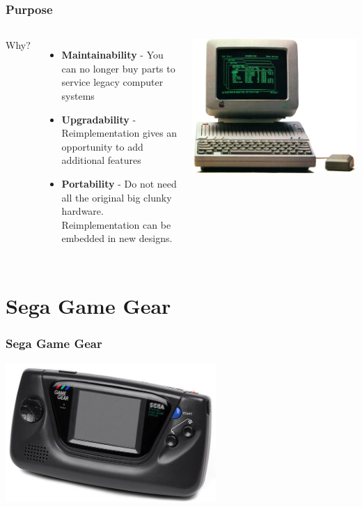 \documentclass{beamer}
\begin{document}
\begin{frame}
    \frametitle{Purpose}

    \begin{columns}[c]
            Why?
            \begin{itemize}
                \item<2-> \textbf{Maintainability} - You can no longer buy parts to service legacy computer systems
                \item<3-> \textbf{Upgradability} - Reimplementation gives an opportunity to add additional features
                \item<4-> \textbf{Portability} - Do not need all the original big clunky hardware. Reimplementation can
                    be embedded in new designs.
            \end{itemize}

            \includegraphics[width=\textwidth]{apple_2.jpg}
    \end{columns}
\end{frame}

\section{Sega Game Gear}
\begin{frame}
    \frametitle{Sega Game Gear}
    \begin{center}
        \includegraphics[width=0.6\textwidth]{gg.jpg}
    \end{center}
\end{frame}
\end{document}
